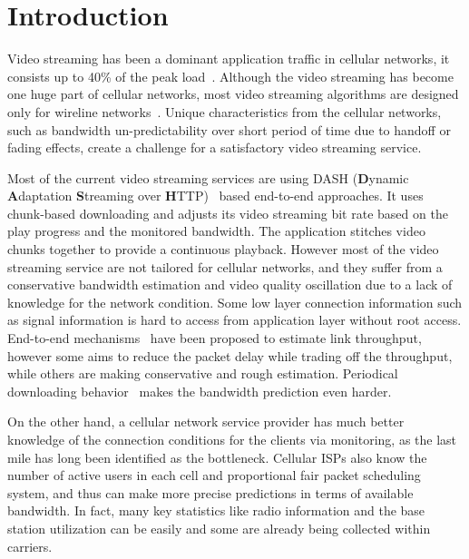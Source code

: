 \section{Introduction}
\label{sec:intro}

Video streaming has been a dominant application traffic in cellular networks, it consists
up to 40\% of the peak load~\cite{LTENetwork, VideoMeasureatt}. Although
the video streaming has become one huge part of cellular networks, most video streaming algorithms are designed only for wireline networks~\cite{BBA, QDASH, Festive}. Unique characteristics from the cellular networks, such as bandwidth un-predictability over short period of
time due to handoff or fading effects, create a challenge for a satisfactory
video streaming service. 

Most of the current video streaming services are using DASH (\textbf{D}ynamic
\textbf{A}daptation \textbf{S}treaming over \textbf{H}TTP)~\cite{DASH} based
end-to-end approaches. It uses chunk-based downloading and adjusts its video
streaming bit rate based on the play progress and the monitored bandwidth. The
application stitches video chunks together to provide a continuous playback.
However most of the video streaming service are not tailored for cellular networks, and they suffer from a conservative bandwidth estimation and video quality oscillation due to a lack of knowledge for the network condition. 
Some low layer connection information such as signal information is hard to access from application layer without root access.
End-to-end mechanisms~\cite{Sprout, QDASH, Festive} have been proposed to estimate link throughput, however some aims to reduce the packet delay while trading off the throughput, while others are making conservative and rough estimation. Periodical downloading behavior~\cite{OnOff} makes the bandwidth prediction even harder.

On the other hand, a cellular network service provider has much better knowledge of the connection
conditions for the clients via monitoring, as the last mile has long been identified as the
bottleneck\cite{LASTMILE}. Cellular ISPs also know the number of
active users in each cell and proportional fair packet scheduling system, and thus can make more
precise predictions in terms of available bandwidth. In fact, many key statistics like radio information and the base station utilization can be easily and some are
already being collected within carriers. 

